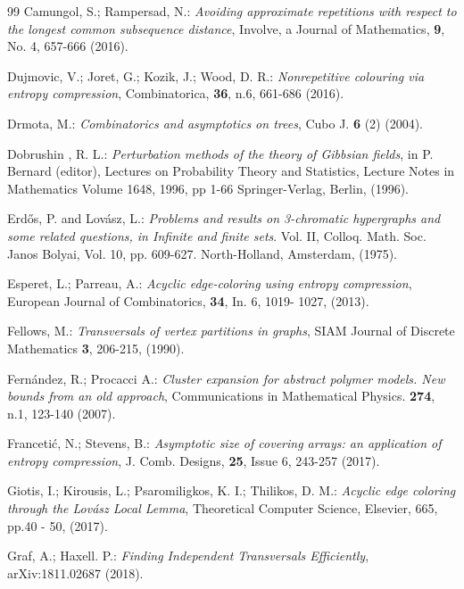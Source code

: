 \documentclass[11pt]{article}
\begin{document}
\begin{thebibliography}{99}
 Camungol, S.; Rampersad, N.:  {\it Avoiding approximate repetitions with respect to the
longest common subsequence distance}, Involve, a Journal of Mathematics, {\bf 9},  No. 4, 657-666 (2016).

 Dujmovic, V.; Joret, G.; Kozik, J.; Wood, D. R.:
{\it Nonrepetitive colouring via entropy compression}, Combinatorica, {\bf 36}, n.6,  661-686 (2016).

 Drmota, M.: {\it Combinatorics and asymptotics on trees}, Cubo J. {\bf 6} (2) (2004).

 Dobrushin , R. L.: {\it Perturbation methods of the theory of
Gibbsian fields}, in P. Bernard (editor), Lectures on Probability Theory and Statistics,
Lecture Notes in Mathematics Volume 1648, 1996, pp 1-66
Springer-Verlag, Berlin, (1996).

 Erd\H{o}s, P. and Lov\'{a}sz, L.: {\it Problems and results on 3-chromatic
hypergraphs and some related questions, in Infinite and finite
sets}. Vol. II, Colloq. Math. Soc. Janos Bolyai, Vol. 10, pp. 609-627.
North-Holland, Amsterdam, (1975).

 Esperet, L.; Parreau, A.: {\it Acyclic edge-coloring using entropy
compression}, European Journal of Combinatorics, {\bf 34}, In. 6,
1019- 1027, (2013).

 Fellows, M.: {\it Transversals of vertex partitions in graphs}, SIAM Journal of Discrete Mathematics
{\bf 3}, 206-215, (1990).

 Fern\'andez, R.; Procacci A.: {\it Cluster
expansion for abstract polymer models. New bounds from an old
approach}, Communications in Mathematical Physics. {\bf 274}, n.1,
123-140 (2007).

 Franceti\'c, N.;  Stevens, B.:
{\it Asymptotic size of covering arrays: an application of entropy compression},
J. Comb. Designs, {\bf  25}, Issue 6,
243-257 (2017).


 Giotis, I.; Kirousis, L.; Psaromiligkos, K. I.; Thilikos, D. M.: {\it  Acyclic edge coloring
through the Lov\'asz Local Lemma}, Theoretical Computer Science, Elsevier, 665, pp.40 - 50, (2017).

 Graf, A.; Haxell. P.: {\it Finding Independent Transversals Efficiently}, arXiv:1811.02687 (2018).


\end{thebibliography}
\end{document}
